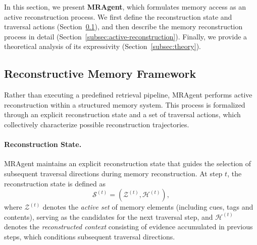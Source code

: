\documentclass{llmxive}
\begin{document}
In this section, we present \textbf{MRAgent}, which formulates memory access as an active reconstruction process. We first define the reconstruction state and traversal actions (Section~\ref{subsec:reconstructive}), and then describe the memory reconstruction process in detail (Section~\ref{subsec:active-reconstruction}).
Finally, we provide a theoretical analysis of its expressivity (Section~\ref{subsec:theory}).

\subsection{Reconstructive Memory Framework}
\label{subsec:reconstructive}

Rather than executing a predefined retrieval pipeline, MRAgent  performs active reconstruction within a structured memory system. This process is formalized through an explicit reconstruction state and a set of traversal actions, which collectively characterize possible reconstruction trajectories.  


\paragraph{Reconstruction State.} MRAgent maintains an explicit reconstruction state that guides the selection of
subsequent traversal directions during memory reconstruction.
At step $t$, the reconstruction state is defined as
\begin{equation}
\mathcal{S}^{(t)} = (\mathcal{Z}^{(t)}, \mathcal{H}^{(t)}),
\end{equation}
where $\mathcal{Z}^{(t)}$ denotes the \emph{active set} of memory elements (including cues, tags and contents), serving as the candidates for the next traversal step, and $\mathcal{H}^{(t)}$ denotes the \emph{reconstructed context} consisting of evidence accumulated in previous steps, which conditions subsequent traversal directions.
\end{document}

